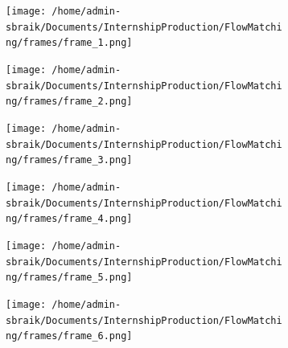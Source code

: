 \documentclass{beamer}
\begin{document}
\begin{frame}
    \begin{figure}[h]
        \centering
        \begin{subfigure}[b]{0.8\textwidth}
          \texttt{[image: /home/admin-sbraik/Documents/InternshipProduction/FlowMatching/frames/frame\_1.png]}
        \end{subfigure}
        \par\medskip
        \begin{subfigure}[b]{0.8\textwidth}
          \texttt{[image: /home/admin-sbraik/Documents/InternshipProduction/FlowMatching/frames/frame\_2.png]}
        \end{subfigure}
    \end{figure}

\end{frame}

\begin{frame}
    \begin{figure}[htbp]
        \centering
        \begin{subfigure}[b]{0.8\textwidth}
          \texttt{[image: /home/admin-sbraik/Documents/InternshipProduction/FlowMatching/frames/frame\_3.png]}
        \end{subfigure}
        \par\medskip
        \begin{subfigure}[b]{0.8\textwidth}
          \texttt{[image: /home/admin-sbraik/Documents/InternshipProduction/FlowMatching/frames/frame\_4.png]}
        \end{subfigure}
    \end{figure}
\end{frame}
\begin{frame}
    \begin{figure}[htbp]
        \centering
        \begin{subfigure}[b]{0.8\textwidth}
          \texttt{[image: /home/admin-sbraik/Documents/InternshipProduction/FlowMatching/frames/frame\_5.png]}
        \end{subfigure}
        \par\medskip
        \begin{subfigure}[b]{0.8\textwidth}
          \texttt{[image: /home/admin-sbraik/Documents/InternshipProduction/FlowMatching/frames/frame\_6.png]}
        \end{subfigure}
        
        \label{fig:interpolated_density}
    \end{figure}
\end{frame}
\end{document}
